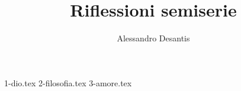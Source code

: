 \documentclass[a4paper,oneside,11pt]{memoir}
\title{Riflessioni semiserie}
\author{Alessandro Desantis}
\date{}
\begin{document}
    \begin{titlingpage}
        \maketitle
    \end{titlingpage}


    {1-dio.tex}
    {2-filosofia.tex}
    {3-amore.tex}
\end{document}
